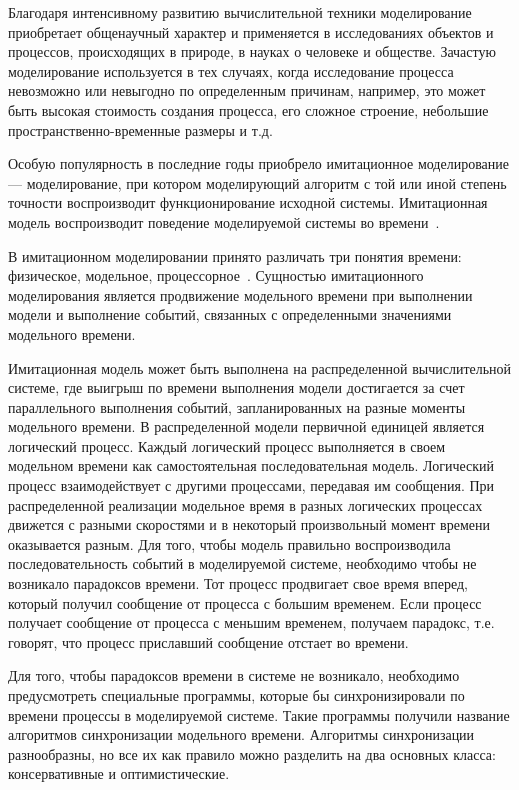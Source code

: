 
{\actuality} 


Благодаря интенсивному развитию вычислительной техники моделирование приобретает общенаучный характер и применяется в исследованиях объектов и процессов, происходящих в природе, в науках о человеке и обществе. Зачастую моделирование используется в тех случаях, когда исследование процесса невозможно или невыгодно по определенным причинам, например, это может быть высокая стоимость создания процесса, его сложное строение, небольшие пространственно-временные размеры и т.д.

Особую популярность в последние годы приобрело имитационное моделирование --- моделирование, при котором моделирующий алгоритм с той или иной степень точности воспроизводит функционирование исходной системы. Имитационная модель воспроизводит поведение моделируемой системы во времени~\cite{disksobmod}.

В имитационном моделировании принято различать три понятия времени: физическое, модельное, процессорное~\cite{voz-disser}. Сущностью имитационного моделирования является продвижение модельного времени при выполнении модели и выполнение событий, связанных с определенными значениями модельного времени.

Имитационная модель может быть выполнена на распределенной вычислительной системе, где выигрыш по времени выполнения модели достигается за счет параллельного выполнения событий, запланированных на разные моменты модельного времени. В распределенной модели первичной единицей является логический процесс. Каждый логический процесс выполняется в своем модельном времени как самостоятельная последовательная модель. Логический процесс взаимодействует с другими процессами, передавая им сообщения. При распределенной реализации модельное время в разных логических процессах движется с разными скоростями и в некоторый произвольный момент времени оказывается разным. Для того, чтобы модель правильно воспроизводила последовательность событий в моделируемой системе, необходимо чтобы не возникало парадоксов времени. Тот процесс продвигает свое время вперед, который получил сообщение от процесса с большим временем. Если процесс получает сообщение от процесса с меньшим временем, получаем парадокс, т.е. говорят, что процесс приславший сообщение  отстает во времени.

Для того, чтобы парадоксов времени в системе не возникало, необходимо предусмотреть специальные программы, которые бы синхронизировали по времени процессы в моделируемой системе. Такие программы получили название алгоритмов синхронизации модельного времени. Алгоритмы синхронизации разнообразны, но все их как правило можно разделить на два основных класса: консервативные и оптимистические.

